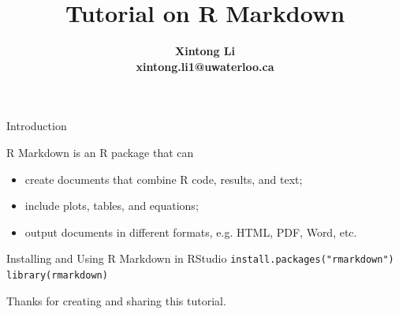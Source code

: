 \documentclass[9pt,handout]{beamer}
\title[\textbf{Efficient Nested Simulation with ML Proxy}]{Tutorial on R Markdown}
\author[\textbf{Xintong Li, xintong.li1@uwaterloo.ca}]
{\Large\bfseries
Xintong Li\\\medskip
xintong.li1@uwaterloo.ca
}
\institute[\textbf{University of Waterloo, Actuarial Science}] %
{\large\bfseries
Dept. Statistics and Actuarial Science\\\smallskip
University of Waterloo %
}
\newcommand{\skipv}{\vspace{8pt}}
\begin{document}
{
\beamertemplatenavigationsymbolsempty
\begin{frame}[plain]
\titlepage
\end{frame}
}



\addtocounter{framenumber}{-1}

\begin{frame}{Introduction}

    R Markdown is an R package that can
    \skipv
    \begin{itemize}
        \item   create documents that combine R code, results, and text;
        \skipv
        \item   include plots, tables, and equations;
        \skipv
        \item   output documents in different formats, e.g. HTML, PDF, Word, etc.
    \end{itemize}
    \skipv
    \begin{block}{Installing and Using R Markdown in RStudio} 
        \quad \texttt{install.packages("rmarkdown")} \\ 
        \quad \texttt{library(rmarkdown)}
    \end{block}
    \skipv
    Thanks \cite{ourcodingclubGettingStarted} for creating and sharing this tutorial.

\end{frame}
\end{document}
